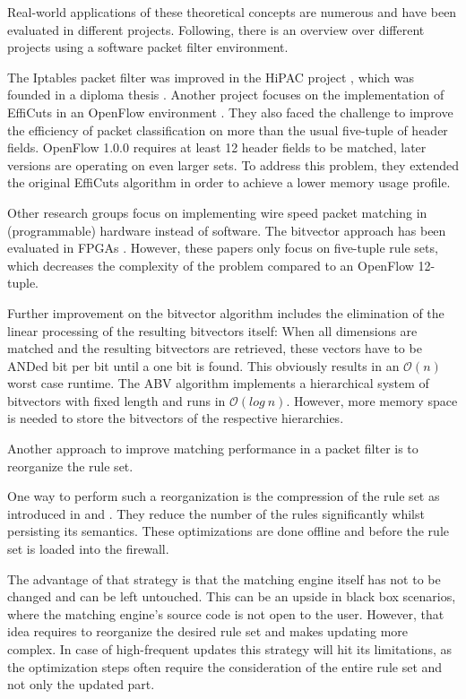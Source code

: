 \documentclass[a4paper,
		12pt,
		parskip=full,
		titlepage
		]{scrartcl}
\begin{document}
Real-world applications of these theoretical concepts are numerous and have been evaluated in different projects.
Following, there is an overview over different projects using a software packet filter environment.

The Iptables packet filter was improved in the HiPAC project \cite{hipac}, which was founded in a diploma thesis \cite{heinzhigh}.
Another project focuses on the implementation of EffiCuts in an OpenFlow environment \cite{stimpfling2013optimal}.
They also faced the challenge to improve the efficiency of packet classification on more than the usual five-tuple of header fields.
OpenFlow 1.0.0 \cite{openflow_spec10} requires at least 12 header fields to be matched, later versions are operating on even larger sets.
To address this problem, they extended the original EffiCuts algorithm in order to achieve a lower memory usage profile.

Other research groups focus on implementing wire speed packet matching in (programmable) hardware instead of software.
The bitvector approach \cite{bv} has been evaluated in FPGAs \cite{bitvector_fpga} \cite{qu2013fast}.
However, these papers only focus on five-tuple rule sets, which decreases the complexity of the problem compared to an OpenFlow 12-tuple.

Further improvement on the bitvector algorithm includes the elimination of the linear processing of the resulting bitvectors itself:
When all dimensions are matched and the resulting bitvectors are retrieved, these vectors have to be ANDed bit per bit until a one bit is found.
This obviously results in an $\mathcal O(n)$ worst case runtime.
The ABV algorithm \cite{abv} implements a hierarchical system of bitvectors with fixed length and runs in $\mathcal O(log\ n)$.
However, more memory space is needed to store the bitvectors of the respective hierarchies.

Another approach to improve matching performance in a packet filter is to reorganize the rule set.

One way to perform such a reorganization is the compression of the rule set as introduced in \cite{firewall_compressor} and \cite{redundancy_removal}.
They reduce the number of the rules significantly whilst persisting its semantics.
These optimizations are done offline and before the rule set is loaded into the firewall.

The advantage of that strategy is that the matching engine itself has not to be changed and can be left untouched.
This can be an upside in black box scenarios, where the matching engine's source code is not open to the user.
However, that idea requires to reorganize the desired rule set and makes updating more complex.
In case of high-frequent updates this strategy will hit its limitations, as the optimization steps often require the consideration of the entire rule set and not only the updated part.


\newpage
{}


\end{document}
